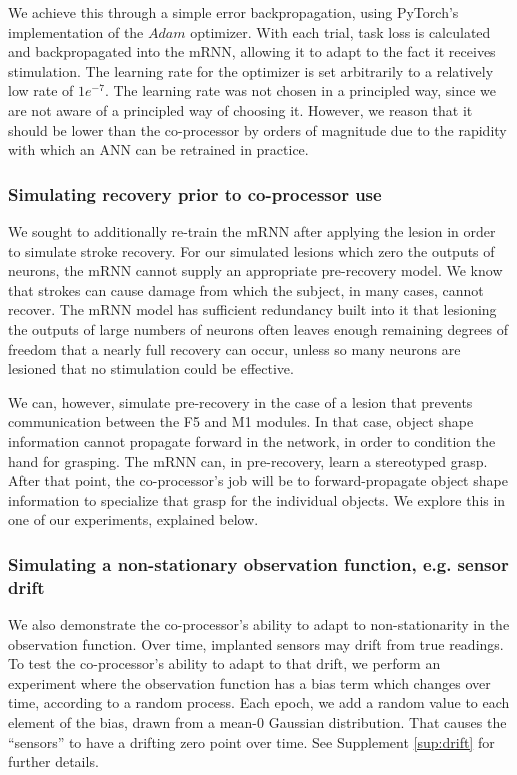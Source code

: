 \documentclass[12pt]{iopart}
\begin{document}
We achieve this through a simple error backpropagation, using PyTorch's
implementation of the $Adam$ optimizer. With each trial, task loss is
calculated and backpropagated into the mRNN, allowing it to adapt to
the fact it receives stimulation. The learning rate for the optimizer
is set arbitrarily to a relatively low rate of $1e^{-7}$. The learning
rate was not chosen in a principled way, since we are not aware of a
principled way of choosing it. However, we reason that it should be
lower than the co-processor by orders of magnitude due
to the rapidity with which an ANN can be retrained in practice.

\subsubsection{Simulating recovery prior to co-processor use}
We sought to additionally re-train the mRNN after applying the lesion in
order to simulate stroke recovery. For our simulated lesions which zero
the outputs of neurons, the mRNN cannot supply an appropriate pre-recovery model.
We know that strokes can cause damage from which the subject, in many cases,
cannot recover. The mRNN model has sufficient redundancy built into it that
lesioning the outputs of large numbers of neurons often leaves enough remaining
degrees of freedom that a nearly full recovery can occur, unless so many
neurons are lesioned that no stimulation could be effective.

We can, however, simulate pre-recovery in the case of a lesion that prevents
communication between the F5 and M1 modules. In that case, object shape information
cannot propagate forward in the network, in order to condition the hand for
grasping. The mRNN can, in pre-recovery, learn a stereotyped grasp. After that point,
the co-processor's job will be to forward-propagate object shape information
to specialize that grasp for the individual objects. We explore this in one of our
experiments, explained below.

\subsubsection{Simulating a non-stationary observation function, e.g. sensor drift}
We also demonstrate the co-processor's ability to adapt to non-stationarity in the observation
function. Over time, implanted sensors may drift from true readings. To test the co-processor's
ability to adapt to that drift, we perform an experiment where the observation function
has a bias term which changes over time, according to a random process. Each epoch, we
add a random value to each element of the bias, drawn from a mean-0 Gaussian distribution. That
causes the ``sensors'' to have a drifting zero point over time.
See Supplement \ref{sup:drift} for further details.
\end{document}
